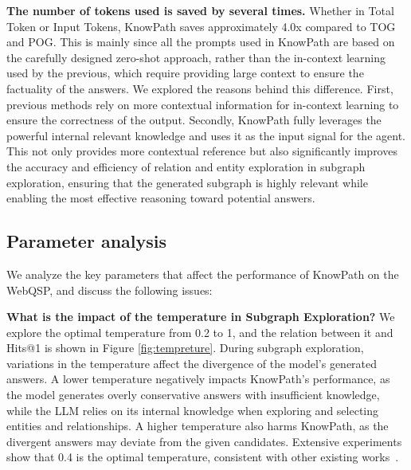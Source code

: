 \textbf{The number of tokens used is saved by several times.}
Whether in Total Token or Input Tokens, KnowPath saves approximately 4.0x compared to TOG and POG. 
This is mainly since all the prompts used in KnowPath are based on the carefully designed zero-shot approach, rather than the in-context learning used by the previous, which require providing large context to ensure the factuality of the answers.
We explored the reasons behind this difference.
First, previous methods rely on more contextual information for in-context learning to ensure the correctness of the output.
Secondly, KnowPath fully leverages the powerful internal relevant knowledge and uses it as the input signal for the agent.
This not only provides more contextual reference but also significantly improves the accuracy and efficiency of relation and entity exploration in subgraph exploration, ensuring that the generated subgraph is highly relevant while enabling the most effective reasoning toward potential answers.



\subsection{Parameter analysis}





We analyze the key parameters that affect the performance of KnowPath on the WebQSP, and discuss the following issues:

\textbf{What is the impact of the temperature in Subgraph Exploration?}
We explore the optimal temperature from 0.2 to 1, and the relation between it and Hits@1 is shown in Figure \ref{fig:tempreture}.
During subgraph exploration, variations in the temperature affect the divergence of the model's generated answers. A lower temperature negatively impacts KnowPath's performance, as the model generates overly conservative answers with insufficient knowledge, while the LLM relies on its internal knowledge when exploring and selecting entities and relationships. A higher temperature also harms KnowPath, as the divergent answers may deviate from the given candidates.
Extensive experiments show that 0.4 is the optimal temperature, consistent with other existing works~\cite{pog}.


